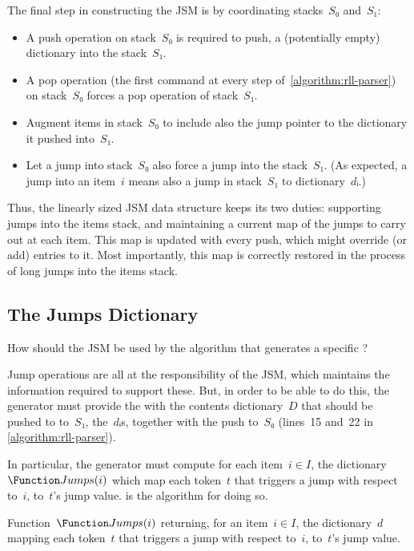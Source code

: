 The final step in constructing the JSM is by coordinating
stacks~$S₀$ and~$S₁$:
\begin{itemize}
  \item A push operation on stack~$S₀$ is required to push, a (potentially
        empty) dictionary into the stack~$S₁$.
  \item A pop operation (the first command at every step of~\cref{algorithm:rll-parser})
        on stack~$S₀$ forces a pop operation of stack~$S₁$.
  \item Augment items in stack~$S₀$ to include also the jump pointer to
        the dictionary it pushed into~$S₁$.
  \item Let a jump into stack~$S₀$ also
        force a jump into the stack~$S₁$.
        (As expected, a jump into an item~$i$ means also a jump
        in stack~$S₁$ to dictionary~$dᵢ$.)
\end{itemize}
Thus, the linearly sized JSM data structure keeps its two
duties: supporting jumps into the items stack,
and maintaining a current map of the jumps to carry out at each item.
This map is updated with every push, which might
override (or add) entries to it.
Most importantly, this map is correctly restored
in the process of long jumps into the items stack.

\subsection{The Jumps Dictionary}
How should the JSM be used by the algorithm that generates
a specific \RLLp?

Jump operations are all at the responsibility of the JSM,
which maintains the information required to support these.
But, in order to be able to do this, the generator must
provide the \RLLp with the contents dictionary~$D$ that should be pushed to
to~$S₁$, the~$dᵢ$s, together with the push to~$S₀$ (lines~15 and~22 in
\cref{algorithm:rll-parser}).

In particular, the \RLLp generator must compute for each
item~$i∈I$, the dictionary~$\Function Jumps(i)$ which
map each token~$t$ that triggers a jump with
respect to~$i$, to~$t$'s jump value.
 is the algorithm for doing so.

\begin{algorithm}
  \begin{algorithmic}
  \caption{\label{algorithm:coordination}
    Function~$\Function Jumps(i)$ returning, for an item~$i∈I$,
  the dictionary~$d$ mapping each token~$t$ that
    triggers a jump with respect to~$i$, to~$t$'s jump value.
  }
   
   
      \BREAK
    \FI
       
      \FI
    \ENDFOR %
  \ENDFOR
  \end{algorithmic}
\end{algorithm}

